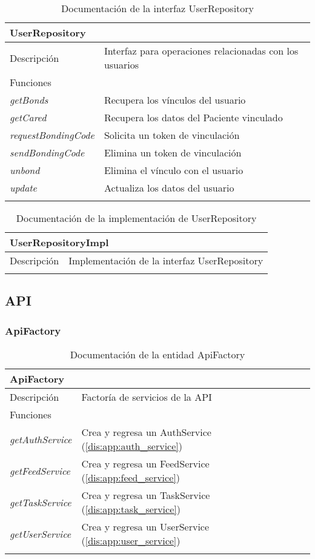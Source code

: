 \begin{longtable}{|p{} p{}|}
    \hline
    \multicolumn{2}{|l|}{UserRepository} \\ \hline \hline
    Descripción      & Interfaz para operaciones relacionadas con los usuarios \\ \hline
    \multicolumn{2}{|l|}{Funciones} \\
    \emph{getBonds}  & Recupera los vínculos del usuario \\
    \emph{getCared}  & Recupera los datos del Paciente vinculado \\
    \emph{requestBondingCode}  & Solicita un token de vinculación \\
    \emph{sendBondingCode}  & Elimina un token de vinculación \\
    \emph{unbond} & Elimina el vínculo con el usuario \\
    \emph{update}  & Actualiza los datos del usuario \\ \hline
    \caption{Documentación de la interfaz UserRepository}
    \label{dis:app:user_repository}
\end{longtable}

\begin{longtable}{|p{} p{}|}
    \hline
    \multicolumn{2}{|l|}{\textbf{UserRepositoryImpl}} \\ \hline \hline
    Descripción      & Implementación de la interfaz UserRepository \\ \hline
    \caption{Documentación de la implementación de UserRepository}
    \label{dis:app:user_repository_impl}
\end{longtable}

\newpage
\subsection{API}

\subsubsection{ApiFactory}

\begin{longtable}{|p{} p{}|}
    \hline
    \multicolumn{2}{|l|}{ApiFactory} \\ \hline \hline
    Descripción      & Factoría de servicios de la API \\ \hline
    \multicolumn{2}{|l|}{Funciones} \\
    \emph{getAuthService}  & Crea y regresa un AuthService (\ref{dis:app:auth_service}) \\
    \emph{getFeedService}  & Crea y regresa un FeedService (\ref{dis:app:feed_service})  \\
    \emph{getTaskService}  & Crea y regresa un TaskService (\ref{dis:app:task_service})  \\
    \emph{getUserService}  & Crea y regresa un UserService (\ref{dis:app:user_service})  \\ \hline
    \caption{Documentación de la entidad ApiFactory}
    \label{dis:app:api_factory}
\end{longtable}

